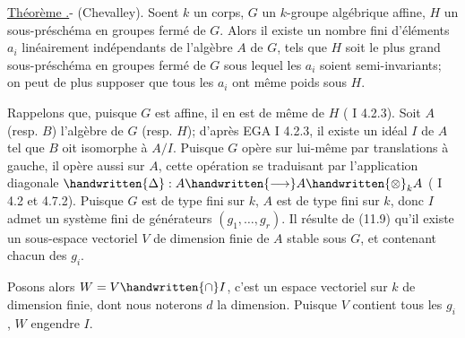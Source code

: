 
\uline{Théorème .}- (Chevalley). Soent $k$ un corps, $G$ un $k$-groupe algébrique affine, $H$ un sous-préschéma en groupes fermé de $G$. Alors il existe un nombre fini d'éléments $a_i$ linéairement indépendants de l'algèbre $A$ de $G$, tels que $H$ soit le plus grand sous-préschéma en groupes fermé de $G$ sous lequel les $a_i$ soient semi-invariants; on peut de plus supposer que tous les $a_i$ ont même  poids\deleted{)} sous $H$.

Rappelons que, puisque $G$ est affine, il en est de même de $H$ ( I 4.2.3). Soit $A$ (resp. $B$) l'algèbre de $G$ (resp. $H$); d'après \deleted{(}EGA I 4.2.3, il existe un idéal $I$ de $A$ tel que $B$ oit isomorphe à $A/I$. Puisque $G$ opère sur lui-même par translations à gauche, il opère aussi sur $A$, cette opération se traduisant par l'application diagonale $\handwritten{\Delta}:A\handwritten{\longrightarrow}A\handwritten{\otimes}_k A$ ( I 4.2 et 4.7.2). Puisque $G$ est de type fini sur $k$, $A$ est de type fini sur $k$, donc $I$  admet un système fini de générateurs $(g_1,\ldots,g_r)$. Il résulte de (11.9) qu'il existe un sous-espace vectoriel $V$ de dimension finie de $A$  stable sous $G$, et contenant chacun des $g_i$.

Posons alors $W=V\handwritten{\cap}I$, c'est un espace vectoriel sur $k$ de dimension finie, dont nous noterons $d$ la dimension. Puisque $V$ contient tous les $g_i$, $W$ engendre  $I$.

